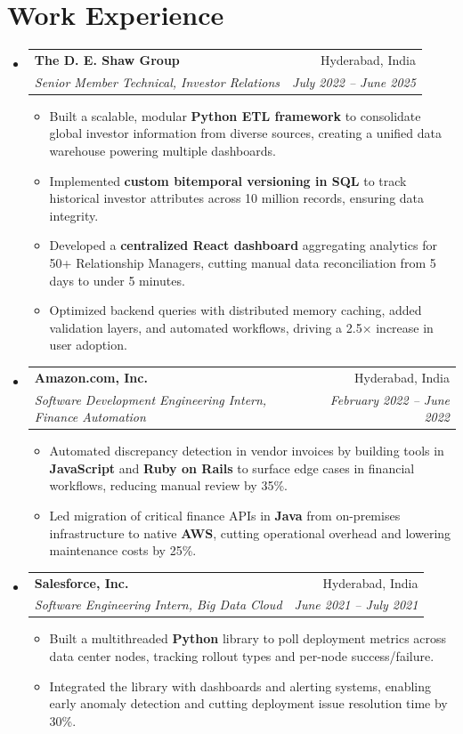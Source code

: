 \documentclass[letterpaper,11pt]{article}
\makeatletter
\newcommand{\resumeSubheading}[4]{
  \vspace{-1pt}\item
    \begin{tabular*}{0.97\textwidth}{l@{\extracolsep{\fill}}r}
      \textbf{#1} & #2\\
      \textit{\small #3} & \textit{\small #4} \\
    \end{tabular*}\vspace{-5pt}
}
\newcommand{\resumeSubHeadingListStart}{\begin{itemize}[leftmargin=*]}
\newcommand{\resumeSubHeadingListEnd}{\end{itemize}}
\makeatother
\begin{document}
{\section{Work Experience}
  \resumeSubHeadingListStart
    \resumeSubheading
      {The D. E. Shaw Group}{Hyderabad, India}
      {Senior Member Technical, Investor Relations}{July 2022 -- June 2025}
        \begin{itemize}[leftmargin=*,noitemsep]
            \item Built a scalable, modular \textbf{Python ETL framework} to consolidate global investor information from diverse sources, creating a unified data warehouse powering multiple dashboards.
            \item Implemented \textbf{custom bitemporal versioning in SQL} to track historical investor attributes across 10 million records, ensuring data integrity.
            \item Developed a \textbf{centralized React dashboard} aggregating analytics for 50+ Relationship Managers, cutting manual data reconciliation from 5 days to under 5 minutes.
            \item Optimized backend queries with distributed memory caching, added validation layers, and automated workflows, driving a 2.5× increase in user adoption.
      \end{itemize}
    \vspace{-0.75em} 
    \resumeSubheading
      {Amazon.com, Inc.}{Hyderabad, India}
      {Software Development Engineering Intern, Finance Automation}{February 2022 -- June 2022}
      \begin{itemize}[leftmargin=*,noitemsep]
        \item Automated discrepancy detection in vendor invoices by building tools in \textbf{JavaScript} and \textbf{Ruby on Rails} to surface edge cases in financial workflows, reducing manual review by 35\%.
        \item Led migration of critical finance APIs in \textbf{Java} from on-premises infrastructure to native \textbf{AWS}, cutting operational overhead and lowering maintenance costs by 25\%.
      \end{itemize}
    \vspace{-0.75em} 
    \resumeSubheading
      {Salesforce, Inc.}{Hyderabad, India}
      {Software Engineering Intern, Big Data Cloud}{June 2021 -- July 2021}
      \begin{itemize}[leftmargin=*,noitemsep]
        \item Built a multithreaded \textbf{Python} library to poll deployment metrics across data center nodes, tracking rollout types and per-node success/failure.
        \item Integrated the library with dashboards and alerting systems, enabling early anomaly detection and cutting deployment issue resolution time by 30\%.
      \end{itemize}
  \resumeSubHeadingListEnd

}
\end{document}
